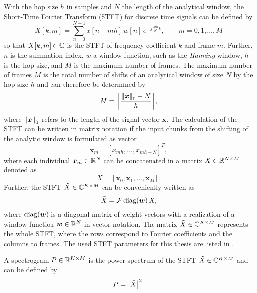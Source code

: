 With the hop size $h$ in samples and $N$ the length of the analytical window, the Short-Time Fourier Transform (STFT) for discrete time signals can be defined by
\begin{equation}\label{eq:signal_spec_stft}
  \tilde{X}[k, m] = \sum_{n=0}^{N-1} x[n + m h] \, w[n] \, e^{-j\frac{2 \pi n}{N}k}, \qquad m = 0, 1, \dots, M
\end{equation}
so that $\tilde{X}[k, m] \in \mathbb{C}$ is the STFT of frequency coefficient $k$ and frame $m$.
Further, $n$ is the summation index, $w$ a window function, such as the \emph{Hanning} window, $h$ is the hop size, and $M$ is the maximum number of frames.
The maximum number of frames $M$ is the total number of shifts of an analytical window of size $N$ by the hop size $h$ and can therefore be determined by
\begin{equation}\label{eq:signal_spec_hop}
  M = \ceil*{\frac{\norm{\bm{x}}_0-N}{h}},
\end{equation}
where $\norm{\bm{x}}_0$ refers to the length of the signal vector $\bm{x}$.
The calculation of the STFT can be written in matrix notation if the input chunks from the shifting of the analytic window is formulated as vector
\begin{equation}
  \bm{x}_m = [x_{m h}, \dots, x_{m h+N}]^T,
\end{equation}
where each individual $\bm{x}_m \in \mathbb{R}^N$ can be concatenated in a matrix $X \in \mathbb{R}^{N \times M}$ denoted as
\begin{equation}
  X = [\bm{x}_0, \bm{x}_1, \dots, \bm{x}_M].
\end{equation}
Further, the STFT $\tilde{X} \in \mathbb{C}^{K \times M}$ can be conveniently written as
\begin{equation}\label{eq:signal_spec_stft_matrix}
  \tilde{X} = \mathcal{F} \mathop{\mathrm{diag}(\bm{w})} X,
\end{equation}
where $\mathop{\mathrm{diag}(\bm{w})}$ is a diagonal matrix of weight vectors with a realization of a window function $\bm{w} \in \mathbb{R}^N$ in vector notation.
The matrix $\tilde{X} \in \mathbb{C}^{K \times M}$ represents the whole STFT, where the rows correspond to Fourier coefficients and the columns to frames.
The used STFT parameters for this thesis are listed in .

A spectrogram $P \in \mathbb{R}^{K \times M}$ is the power spectrum of the STFT $\tilde{X} \in \mathbb{C}^{K \times M}$ and can be defined by
\begin{equation}\label{eq:signal_spec_spec}
  P = \abs{\tilde{X}}^2.
\end{equation}
